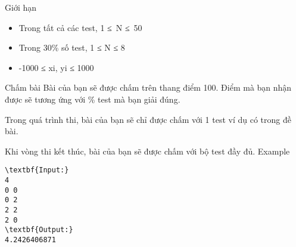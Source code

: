 Giới hạn  
\begin{itemize}
	\item     Trong tất cả các test, 1 ≤ N ≤ 50   
	\item     Trong 30\% số test, 1 ≤ N ≤ 8   
	\item     -1000 ≤ xi, yi ≤ 1000   
\end{itemize}
   Chấm bài  
Bài của bạn sẽ được chấm trên thang điểm 100. Điểm mà bạn nhận được sẽ tương ứng với \% test mà bạn giải đúng.  

   Trong quá trình thi, bài của bạn sẽ chỉ được chấm với 1 test ví dụ có trong đề bài.  

   Khi vòng thi kết thúc, bài của bạn sẽ được chấm với bộ test đầy đủ.
   Example  
\begin{verbatim}
\textbf{Input:}
4
0 0
0 2
2 2
2 0
\textbf{Output:}
4.2426406871\end{verbatim}